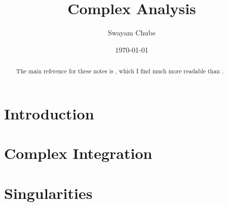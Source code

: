 \documentclass{report}
\title{Complex Analysis}
\author{Swayam Chube}
\date{\today}
\begin{document}
\maketitle 

\begin{abstract}
    The main reference for these notes is \cite{conway}, which I find much more readable than \cite{ahlfors}.
\end{abstract}

\tableofcontents

\chapter{Introduction}


\chapter{Complex Integration}


\chapter{Singularities}




\end{document}
